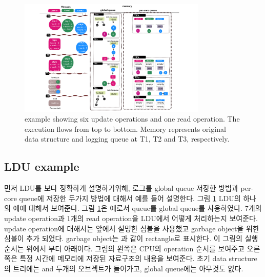 \begin{figure}[t!]
  \begin{center}
     \includegraphics[width=0.8\textwidth,height=0.4\textheight,keepaspectratio]{fig/basic_gldu}
  \end{center}
  \caption{ example showing six update operations and one read
  operation. The execution flows from top to bottom. Memory represents original
  data structure and logging queue at T1, T2 and T3, respectively.}
  \label{fig:basic}
\end{figure}


\subsection{LDU example}

%


\ifkor
먼저 LDU를 보다 정확하게 설명하기위해, 로그를 global queue 저장한 방법과 per-core queue에 저장한 두가지 방법에 대해서
예를 들어 설명한다. 
그림 \ref{fig:basic} LDU의 하나의 예에 대해서 보여준다. 그림 \ref{fig:basic}은 예로서 queue를 global
queue를 사용하였다. 
7개의 update operation과 1개의 read operation을 LDU에서 어떻게 처리하는지 보여준다.
update operation에 대해서는 앞에서 설명한 심볼을 사용했고 garbage object을 위한 심볼이 추가 되었다.
garbage object는 과 같이 rectangle로 표시한다. 
이 그림의 실행 순서는 위에서 부터 아래이다.
그림의 왼쪽은 CPU의 operation 순서를 보여주고 오른쪽은 특정 시간에 메모리에 저장된 자료구조의 내용을 보여준다.
초기 data structure의 트리에는  and  두개의 오브젝트가 들어가고, global
queue에는 아무것도 없다.

